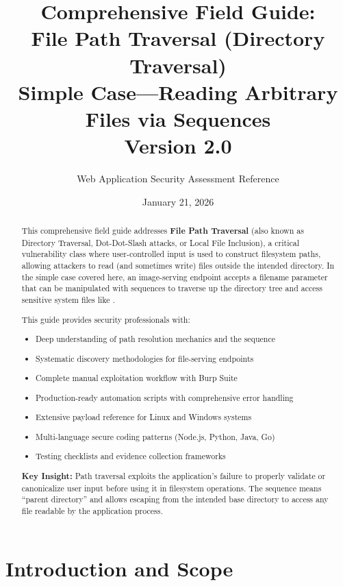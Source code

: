 \documentclass[11pt,letterpaper]{article}
\title{\textbf{Comprehensive Field Guide:\\File Path Traversal (Directory Traversal)}\\[0.5em]
\large Simple Case---Reading Arbitrary Files via \code{../} Sequences\\[0.3em]
\normalsize Version 2.0}
\author{Web Application Security Assessment Reference}
\date{January 21, 2026}
\newcommand{\code}[1]{\texttt{\detokenize{#1}}}
\begin{document}
\maketitle

\begin{abstract}
\noindent This comprehensive field guide addresses \textbf{File Path Traversal} (also known as Directory Traversal, Dot-Dot-Slash attacks, or Local File Inclusion), a critical vulnerability class where user-controlled input is used to construct filesystem paths, allowing attackers to read (and sometimes write) files outside the intended directory. In the simple case covered here, an image-serving endpoint accepts a filename parameter that can be manipulated with \code{../} sequences to traverse up the directory tree and access sensitive system files like \code{/etc/passwd}.

This guide provides security professionals with:
\begin{itemize}
  \item Deep understanding of path resolution mechanics and the \code{../} sequence
  \item Systematic discovery methodologies for file-serving endpoints
  \item Complete manual exploitation workflow with Burp Suite
  \item Production-ready automation scripts with comprehensive error handling
  \item Extensive payload reference for Linux and Windows systems
  \item Multi-language secure coding patterns (Node.js, Python, Java, Go)
  \item Testing checklists and evidence collection frameworks
\end{itemize}

\noindent\textbf{Key Insight:} Path traversal exploits the application's failure to properly validate or canonicalize user input before using it in filesystem operations. The \code{../} sequence means ``parent directory'' and allows escaping from the intended base directory to access any file readable by the application process.
\end{abstract}

\tableofcontents
\newpage

\section{Introduction and Scope}
\end{document}
